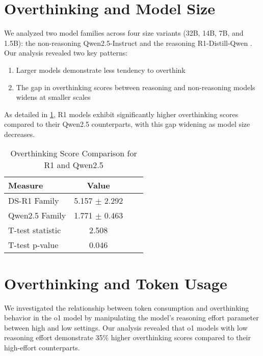 \section{Overthinking and Model Size}
\label{sec:model_size}

We analyzed two model families across four size variants (32B, 14B, 7B, and 1.5B): the non-reasoning Qwen2.5-Instruct \cite{qwen2,qwen2.5} and the reasoning R1-Distill-Qwen \cite{deepseekai2025deepseekr1incentivizingreasoningcapability}. Our analysis revealed two key patterns:

\begin{enumerate}
    \item Larger models demonstrate less tendency to overthink
    \item The gap in overthinking scores between reasoning and non-reasoning models widens at smaller scales
\end{enumerate}

As detailed in \cref{tab:overthinking_comparison}, R1 models exhibit significantly higher overthinking scores compared to their Qwen2.5 counterparts, with this gap widening as model size decreases.

\begin{table}[ht]
\centering
\begin{tabular}{lccc}
\bottomrule
\textbf{Measure} & \textbf{Value} \\
\midrule
DS-R1 Family        & 5.157 $\pm$ 2.292 \\
Qwen2.5 Family      & 1.771 $\pm$ 0.463 \\
\midrule
T-test statistic     & 2.508 \\
T-test p-value       & 0.046 \\
\bottomrule
\end{tabular}
\caption{Overthinking Score Comparison for R1 and Qwen2.5}
\label{tab:overthinking_comparison}
\end{table}

\section{Overthinking and Token Usage}
\label{sec:token_usage}

We investigated the relationship between token consumption and overthinking behavior in the o1 model by manipulating the model's reasoning effort parameter between high and low settings. Our analysis revealed that o1 models with low reasoning effort demonstrate 35\% higher overthinking scores compared to their high-effort counterparts.

